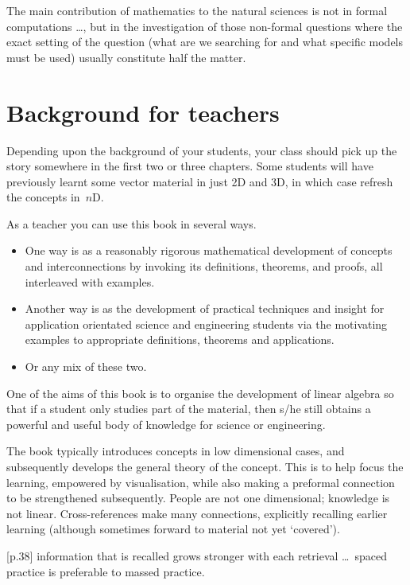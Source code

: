 \begin{quoted}{\cite[p.xiii]{Arnold2014}}
The main contribution of mathematics to the natural sciences is not in formal computations \ldots, but in the investigation of those non-formal questions where the exact setting of the question (what are we searching for and what specific models must be used) usually constitute half the matter.
%
\end{quoted}








\section*{Background for teachers}

Depending upon the background of your students, your class should pick up the story somewhere in the first two or three chapters.
Some students will have previously learnt some vector material in just 2D and 3D,  in which case refresh the concepts in~\(n\)D.

As a teacher you can use this book in several ways.
\begin{itemize}
\item One way is as a reasonably rigorous mathematical development of concepts and interconnections by invoking its definitions, theorems, and proofs, all interleaved with examples.
\item Another way is as the development of practical techniques and insight for application orientated science and engineering students via the motivating examples to appropriate definitions, theorems and applications. 
\item Or any mix of these two.
\end{itemize}

One of the aims of this book is to organise the development of linear algebra so that if a student only studies part of the material, then s/he still obtains a powerful and useful body of knowledge for science or engineering.

The book typically introduces concepts in low dimensional cases, and subsequently develops the general theory of the concept.  
This is to help focus the learning, empowered by visualisation, while also making a preformal connection to be strengthened subsequently.
People are not one dimensional; knowledge is not linear.
Cross-references make many connections, explicitly recalling earlier learning (although sometimes forward to material not yet `covered').
\begin{quoted}{\cite{Halpern2003} [p.38]}
information that is recalled grows stronger with each retrieval \ldots\ spaced practice is preferable to massed practice.
\end{quoted}

